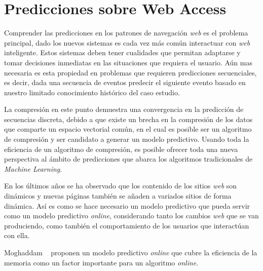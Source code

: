 \chapter[Predicciones sobre Web Access]{Predicciones sobre Web Access} 
\label{ch:predicciones}





Comprender las predicciones en los patrones de navegación \emph{web} es el problema principal, dado los nuevos sistemas es cada vez más común interactuar con \emph{web} inteligente. Estos sistemas deben tener cualidades que permitan adaptarse y tomar decisiones inmediatas en las situaciones que requiera el usuario. Aún mas necesaria es esta propiedad en problemas que requieren predicciones secuenciales, es decir, dada una secuencia de eventos  predecir el siguiente evento basado en nuestro limitado conocimiento histórico del caso estudio.

La compresión en este punto demuestra una convergencia en la predicción de secuencias discreta, debido a que existe un brecha en la compresión de los datos que comparte un espacio vectorial común, en el cual es posible ser un  algoritmo de compresión y ser candidato a generar un modelo predictivo. Usando toda la eficiencia de un algoritmo de compresión, es posible ofrecer toda una nueva perspectiva al ámbito de  predicciones que abarca los algoritmos tradicionales de \emph{Machine Learning}. 

En los últimos años se ha observado que  los contenido de los sitios \emph{web} son dinámicos y nuevas páginas también se añaden a variados sitios de forma dinámica. Así es como  se hace necesario un modelo predictivo que pueda servir como un modelo predictivo \emph{online},  considerando tanto los cambios \emph{web} que se van produciendo, como también el comportamiento de los usuarios que interactúan con ella. 

Moghaddam \etal~\cite{Moghaddam2009} proponen un modelo predictivo \emph{online} que cubre la eficiencia de la memoria como un factor importante para un algoritmo \emph{online}. 


